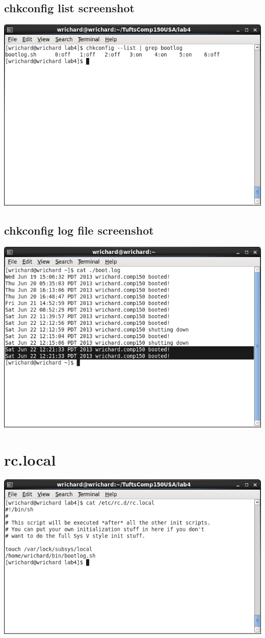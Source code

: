 \documentclass[a4paper,10pt]{article}
\begin{document}
\subsection{chkconfig list screenshot}
  \begin{center}
  \includegraphics[width=\linewidth]{./bootlog_chkconfig.png}
  \end{center}
\subsection{chkconfig log file screenshot}
  \begin{center}
  \includegraphics[width=\linewidth]{./chkconfig_log_file.png}
  \end{center}

\section{rc.local}
  \begin{center}
  \includegraphics[width=\linewidth]{./rclocal.png}
  \end{center}
\end{document}
